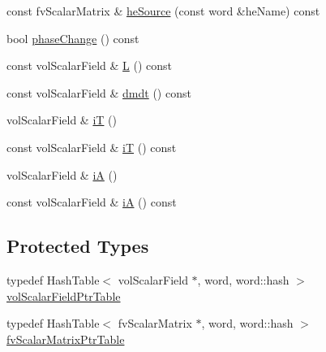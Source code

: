 \begin{DoxyCompactItemize}
\item 
const fv\+Scalar\+Matrix \& \hyperlink{classFoam_1_1FFPair_a648cf9d2ac10af5edf764413c377d3f3}{he\+Source} (const word \&he\+Name) const
\item 
bool \hyperlink{classFoam_1_1FFPair_a734047908162ee80a71312f73aaf8193}{phase\+Change} () const
\item 
const vol\+Scalar\+Field \& \hyperlink{classFoam_1_1FFPair_abe53da7ab6885a0c606832841d7bb49f}{L} () const
\item 
const vol\+Scalar\+Field \& \hyperlink{classFoam_1_1FFPair_a918f3d5a64d7cf4215c6429757e28486}{dmdt} () const
\item 
vol\+Scalar\+Field \& \hyperlink{classFoam_1_1FFPair_a8615a86198b86e1fe02839ec37e58791}{iT} ()
\item 
const vol\+Scalar\+Field \& \hyperlink{classFoam_1_1FFPair_a3a9f983828f0c3a7e72305f182a741f0}{iT} () const
\item 
vol\+Scalar\+Field \& \hyperlink{classFoam_1_1FFPair_ab93f707da22a77ddd3f7f4ac35632294}{iA} ()
\item 
const vol\+Scalar\+Field \& \hyperlink{classFoam_1_1FFPair_ae2c1c1e4f41f42a4dd77007cb706089c}{iA} () const
\end{DoxyCompactItemize}
\subsection*{Protected Types}
\begin{DoxyCompactItemize}
\item 
typedef Hash\+Table$<$ vol\+Scalar\+Field $\ast$, word, word\+::hash $>$ \hyperlink{classFoam_1_1FFPair_a0848121d1a9fe5a3d3471760ef9de2fe}{vol\+Scalar\+Field\+Ptr\+Table}
\item 
typedef Hash\+Table$<$ fv\+Scalar\+Matrix $\ast$, word, word\+::hash $>$ \hyperlink{classFoam_1_1FFPair_a47dacb23df9a151e6da0902f1726ef21}{fv\+Scalar\+Matrix\+Ptr\+Table}
\end{DoxyCompactItemize}
